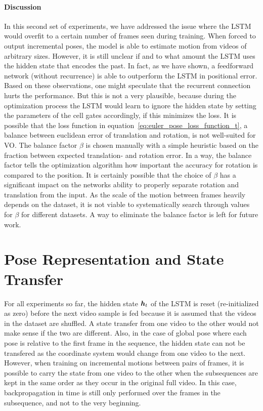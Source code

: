 		\paragraph{Discussion}
		In this second set of experiments, we have addressed the issue where the LSTM would overfit to a certain number of frames seen during training.
		When forced to output incremental poses, the model is able to estimate motion from videos of arbitrary sizes.
		However, it is still unclear if and to what amount the LSTM uses the hidden state that encodes the past.
		In fact, as we have shown, a feedforward network (without recurrence) is able to outperform the LSTM in positional error.
		Based on these observations, one might speculate that the recurrent connection hurts the performance.
		But this is not a very plausible, because during the optimization process the LSTM would learn to ignore the hidden state by setting the parameters of the cell gates accordingly, if this minimizes the loss.
		It is possible that the loss function in equation~\ref{eq:euler_pose_loss_function_t}, a balance between euclidean error of translation and rotation, is not well-suited for VO.
		The balance factor $\beta$ is chosen manually with a simple heuristic based on the fraction between expected translation- and rotation error.
		In a way, the balance factor tells the optimization algorithm how important the accuracy for rotation is compared to the position.
		It is certainly possible that the choice of $\beta$ has a significant impact on the networks ability to properly separate rotation and translation from the input.
		As the scale of the motion between frames heavily depends on the dataset, it is not viable to systematically search through values for $\beta$ for different datasets.
		A way to eliminate the balance factor is left for future work.
		
	\section{Pose Representation and State Transfer}
		For all experiments so far, the hidden state $\bm{h}_t$ of the LSTM is reset (re-initialized as zero) before the next video sample is fed because it is assumed that the videos in the dataset are shuffled.
		A state transfer from one video to the other would not make sense if the two are different.
		Also, in the case of global pose where each pose is relative to the first frame in the sequence, the hidden state can not be transfered as the coordinate system would change from one video to the next.
		However, when training on incremental motions between pairs of frames, it is possible to carry the state from one video to the other when the subsequences are kept in the same order as they occur in the original full video.
		In this case, backpropagation in time is still only performed over the frames in the subsequence, and not to the very beginning.
		
